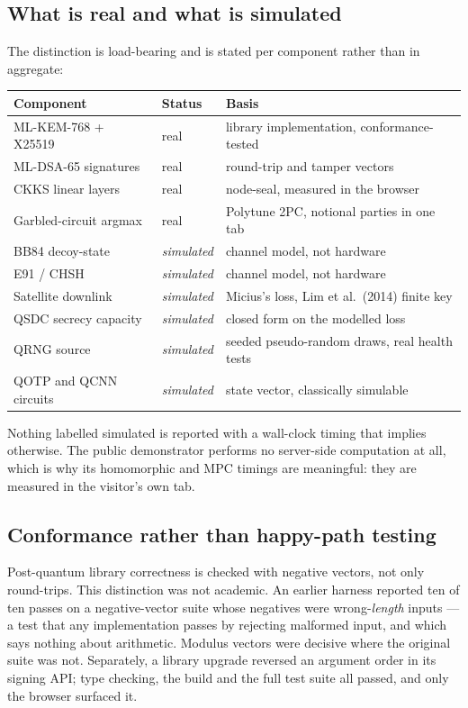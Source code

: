 \documentclass[11pt,a4paper]{article}
\begin{document}
\subsection{What is real and what is simulated}
The distinction is load-bearing and is stated per component rather than in aggregate:

\begin{center}\small
\begin{tabular}{lll}
\toprule
\textbf{Component} & \textbf{Status} & \textbf{Basis} \\
\midrule
ML-KEM-768 + X25519 & real & library implementation, conformance-tested \\
ML-DSA-65 signatures & real & round-trip and tamper vectors \\
CKKS linear layers & real & node-seal, measured in the browser \\
Garbled-circuit argmax & real & Polytune 2PC, notional parties in one tab \\
BB84 decoy-state & \emph{simulated} & channel model, not hardware \\
E91 / CHSH & \emph{simulated} & channel model, not hardware \\
Satellite downlink & \emph{simulated} & Micius's loss, Lim et al.\ (2014) finite key \\
QSDC secrecy capacity & \emph{simulated} & closed form on the modelled loss \\
QRNG source & \emph{simulated} & seeded pseudo-random draws, real health tests \\
QOTP and QCNN circuits & \emph{simulated} & state vector, classically simulable \\
\bottomrule
\end{tabular}
\end{center}

Nothing labelled simulated is reported with a wall-clock timing that implies otherwise. The public
demonstrator performs no server-side computation at all, which is why its homomorphic and MPC
timings are meaningful: they are measured in the visitor's own tab.

\subsection{Conformance rather than happy-path testing}
Post-quantum library correctness is checked with negative vectors, not only round-trips. This
distinction was not academic. An earlier harness reported ten of ten passes on a negative-vector
suite whose negatives were wrong-\emph{length} inputs --- a test that any implementation passes by
rejecting malformed input, and which says nothing about arithmetic. Modulus vectors were decisive
where the original suite was not. Separately, a library upgrade reversed an argument order in its
signing API; type checking, the build and the full test suite all passed, and only the browser
surfaced it.
\end{document}
